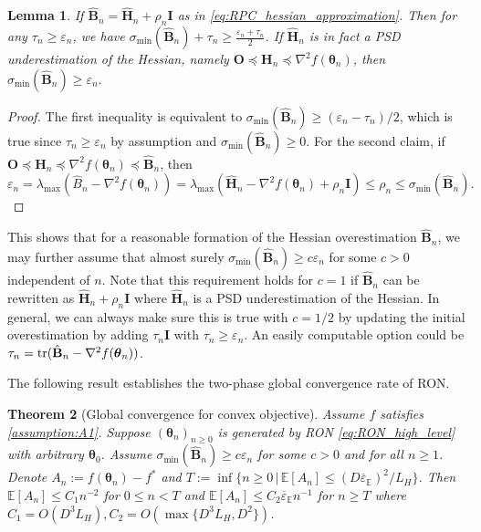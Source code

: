 \documentclass[11pt]{amsart}
\theoremstyle{plain}
\newtheorem{theorem}{Theorem}[section]
\newtheorem{lemma}[theorem]{Lemma}
\theoremstyle{definition}
\theoremstyle{remark}
\def\E{\mathbb{E}}
\def\H{\mathbf{H}}
\def\I{\mathbf{I}}
\def\eps{\varepsilon}
\def\B{\mathbf{B}}
\def\tr{\textup{tr}}
\def\param{\boldsymbol{\theta}}
\def\I{\mathbf{I}}
\newcommand{\commHL}[1]{{\textcolor{blue}{#1}}}
\begin{document}
{
\begin{lemma}
    If $\hat{\B}_n=\hat{\H}_n+\rho_n\I$ as in \eqref{eq:RPC_hessian_approximation}. Then for any $\tau_n\ge \eps_n$, we have
    $\sigma_{\min}(\hat{\B}_n)+\tau_n\ge \frac{\eps_n+\tau_n}{2}$.
    If $\hat{\H}_n$ is in fact a PSD underestimation of the Hessian, namely $\mathbf{O}\preceq \H_n\preceq \nabla^2f(\param_n)$, then $\sigma_{\min}(\hat{\B}_n)\ge \eps_n.$    
\end{lemma}
\begin{proof}
    The first inequality is equivalent to $\sigma_{\min}(\hat{\B}_n)\ge (\eps_n-\tau_n)/2$, which is true since $\tau_n\geq\eps_n$ by assumption and $\sigma_{\min}(\hat{\B}_n)\geq 0.$ For the second claim, if $\mathbf{O}\preceq \H_n\preceq \nabla^2f(\param_n)\preceq \hat{\B}_n$, then
    \[
    \eps_n=\lambda_{\max}(\hat{B}_n-\nabla^2f(\param_n))=\lambda_{\max}(\hat{\H}_n-\nabla^2f(\param_n)+\rho_n\I)\le \rho_n\le \sigma_{\min}(\hat{\B}_n).
    \]
\end{proof}
This shows that for a reasonable formation of the Hessian overestimation $\hat{\B}_n$, we may further assume that almost surely $\sigma_{\min}(\hat{\B}_n)\ge c\eps_n$ for some $c>0$ independent of $n.$ Note that this requirement holds for $c=1$ if $\hat{\B}_n$ can be rewritten as $\hat{\H}_n+\rho_n\mathbf{I}$ where $\hat{\H}_n$ is a PSD underestimation of the Hessian. In general, we can always make sure this is true with $c=1/2$ by updating the initial overestimation by adding $\tau_n\mathbf{I}$ with $\tau_n\geq \eps_n$. An easily computable option could be  $\tau_{n}=\tr(\hat{\B}_{n}-\nabla^{2}f(\param_{n}))$.
}

The following result establishes the two-phase global convergence rate of RON. 

\begin{theorem}[Global convergence for convex objective]\label{thm:convex}
	Assume $f$ satisfies \cref{assumption:A1}. Suppose $(\param_n)_{n\geq 0}$ is generated by RON \eqref{eq:RON_high_level} with arbitrary $\param_0$. %
    Assume $\sigma_{\min}(\hat{\B}_{n})\ge c\eps_{n}$ for some $c>0$ and for all $n\ge 1$. Denote $A_{n}:=f(\param_{n})-f^{*}$ and $T:=\inf \{ n\ge 0 \,|\,\E[A_n] \leq  (D\overline{\eps}_{\E})^{2}/L_H  \}$. Then 
	 $\E[A_{n}] \le C_1n^{-2}$ for $0\le n < T$ and $\E[A_{n}]\le C_2 \overline{\eps}_{\E}n^{-1}$  for $n\ge T$ where $C_1=O(D^3L_H), C_2=O(\max\{D^3L_H,D^2\})$.
\end{theorem}
\end{document}
